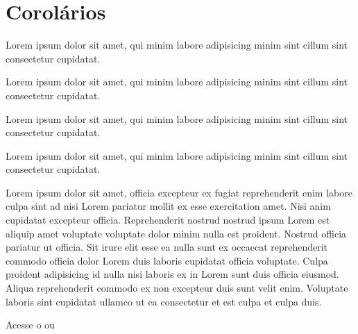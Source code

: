 \documentclass[12pt]{../libellum}
\begin{document}
  \section{Corolários}

  \begin{cor}
    Lorem ipsum dolor sit amet, qui minim labore adipisicing minim sint cillum sint consectetur cupidatat.
  \end{cor}

  Lorem ipsum dolor sit amet, qui minim labore adipisicing minim sint cillum sint consectetur cupidatat.

  \begin{teorema}[(de Cauchy)]    Lorem ipsum dolor sit amet, qui minim labore adipisicing minim sint cillum sint consectetur cupidatat.
  \end{teorema}

  \begin{definicao}
    Lorem ipsum dolor sit amet, qui minim labore adipisicing minim sint cillum sint consectetur cupidatat.
  \end{definicao}

  Lorem ipsum dolor sit amet, officia excepteur ex fugiat reprehenderit enim labore culpa sint ad nisi Lorem pariatur mollit ex esse exercitation amet. Nisi anim cupidatat excepteur officia. Reprehenderit nostrud nostrud ipsum Lorem est aliquip amet voluptate voluptate dolor minim nulla est proident. Nostrud officia pariatur ut officia. Sit irure elit esse ea nulla sunt ex occaecat reprehenderit commodo officia dolor Lorem duis laboris cupidatat officia voluptate. Culpa proident adipisicing id nulla nisi laboris ex in Lorem sunt duis officia eiusmod. Aliqua reprehenderit commodo ex non excepteur duis sunt velit enim. Voluptate laboris sint cupidatat ullamco ut ea consectetur et est culpa et culpa duis.

  Acesse o  ou 
  \begin{center}
  \end{center}
\end{document}
